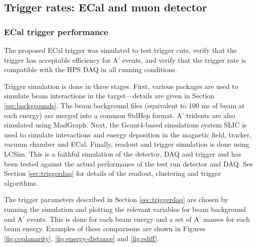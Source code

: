 \subsection{Trigger rates: ECal and muon detector}
\subsubsection{ECal trigger performance}

The proposed ECal trigger was simulated to test trigger cuts, verify that the trigger has acceptable efficiency for A' events, and verify that the trigger rate is compatible with the HPS DAQ in all running conditions.

Trigger simulation is done in three stages. 
First, various packages are used to simulate beam interactions in the target---details are given in Section \ref{sec:backgrounds}.
The beam background files (equivalent to 100 ms of beam at each energy) are merged into a common StdHep format. 
A' tridents are also simulated using MadGraph. 
Next, the Geant4-based simulations system SLIC \cite{slic} is used to simulate interactions and energy deposition in the magnetic field, tracker, vacuum chamber and ECal. 
Finally, readout and trigger simulation is done using LCSim.
This is a faithful simulation of the detector, DAQ and trigger and has been tested against the actual performance of the test run detector and DAQ. See Section \ref{sec:triggerdaq} for details of the readout, clustering and trigger algorithms.

The trigger parameters described in Section \ref{sec:triggerdaq} are chosen by running the simulation and plotting the relevant variables for beam background and A' events. 
This is done for each beam energy and a set of A' masses for each beam energy. Examples of these comparisons are shown in Figures \ref{fig:coplanarity}, \ref{fig:energy-distance} and \ref{fig:ediff}.


